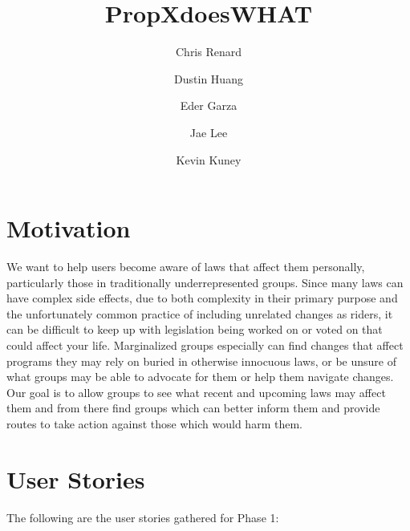 \documentclass[12pt]{article}
\title{PropXdoesWHAT}
\author{Chris Renard \and Dustin Huang \and Eder Garza \and Jae Lee \and Kevin Kuney}
\date{} %
\begin{document}
\maketitle

\section{Motivation}

We want to help users become aware of laws that affect them personally, particularly those in traditionally underrepresented groups. 
Since many laws can have complex side effects, due to both complexity in their primary purpose and the unfortunately common practice of including unrelated changes as riders, it can be difficult to keep up with legislation being worked on or voted on that could affect your life.
Marginalized groups especially can find changes that affect programs they may rely on buried in otherwise innocuous laws, or be unsure of what groups may be able to advocate for them or help them navigate changes.
Our goal is to allow groups to see what recent and upcoming laws may affect them and from there find groups which can better inform them and provide routes to take action against those which would harm them.


\section{User Stories}

The following are the user stories gathered for Phase 1: \vspace{0.5em}
\end{document}
